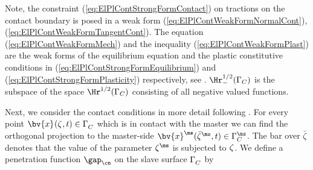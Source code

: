 Note, the constraint (\ref{eq:ElPlContStrongFormContact}) on tractions on the contact boundary  is posed in a weak form (\ref{eq:ElPlContWeakFormNormalCont}), (\ref{eq:ElPlContWeakFormTangentCont}). The equation (\ref{eq:ElPlContWeakFormMech}) and the inequality (\ref{eq:ElPlContWeakFormPlast})  are the weak forms of the equilibrium equation and the plastic constitutive conditions in (\ref{eq:ElPlContStrongFormEquilibrium}) and (\ref{eq:ElPlContStrongFormPlasticity}) respectively, see \cite{WeRe99}. $\Hr^{1/2}_{-}(\Gamma_{C})$ is the subspace of the space $\Hr^{1/2}(\Gamma_{C})$ consisting of all negative valued functions.
\begin{comment}
Replacing generalized stresses $(\bv{\sigma}^{i},\bv{\chi}^i)$ with generalized strains $(\bv{\e}^{pi},\bv{\xi}^i)$, employing  the plastic flow rule in the form  (\ref{eq:ElPlContStrongFormPlasticityDissipation}), adding up the equation (\ref{eq:ElPlContWeakFormMech}),  the inequality  (\ref{eq:ElPlContWeakFormNormalCont}) with $\lambda_{\cn}:=\eta^{\ms\sl}_{\cn}$, the inequality  (\ref{eq:ElPlContWeakFormTangentCont}) with $\lambda_{\ct}:=\eta^{\ms\sl}_{\ct}$ and discretizing in time one obtains the  formulation of the problem $\mathbf{P}_{2b}$ in Section \ref{sec:DiscretizedRateInDependentContact}.
\end{comment}

Next, we consider the contact conditions in more detail following \cite{WrMi94}.
For every point $\bv{x}^{\sl}(\zeta^{\sl},t) \in \Gamma^{\sl}_C$ which is in contact with the master we can find the orthogonal projection to the master-side $\bv{x}^{\ms}(\bar{\zeta}^{\ms},t) \in \Gamma^{\ms}_C$. The bar over $\bar{\zeta}$ denotes that the value of the parameter $\zeta^{\ms}$ is subjected to $\zeta^{\sl}$. We define a penetration function $\gap_{\cn}$ on the slave surface $\Gamma^{\sl}_C$ by

